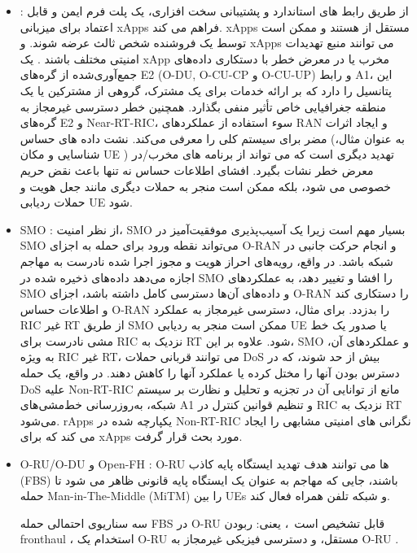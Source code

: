 \begin{itemize}
	\item {} :
	از طریق رابط های استاندارد و پشتیبانی سخت افزاری،  یک پلت فرم ایمن و قابل اعتماد برای میزبانی xApps فراهم می کند. xApps مستقل از  هستند و ممکن است توسط یک فروشنده شخص ثالث عرضه شوند.  و xApps می توانند منبع تهدیدات امنیتی مختلف باشند \cite{ORANSec}.
	یک xApp مخرب یا در معرض خطر با دستکاری داده‌های جمع‌آوری‌شده از گره‌های E2 (O-DU, O-CU-CP و O-CU-UP) و رابط A1، این پتانسیل را دارد که بر ارائه خدمات برای یک مشترک، گروهی از مشترکین یا یک منطقه جغرافیایی خاص تأثیر منفی بگذارد.
	همچنین خطر دسترسی غیرمجاز به گره‌های E2 و Near-RT-RIC، سوء استفاده از عملکردهای RAN و ایجاد اثرات مضر برای سیستم کلی را معرفی می‌کند.
	نشت داده های حساس
	 (به عنوان مثال، شناسایی و مکان 
	 UE
	 ) 
	تهدید دیگری است که می تواند از برنامه های مخرب/در معرض خطر نشات بگیرد.
	افشای اطلاعات حساس نه تنها باعث نقض حریم خصوصی می شود، بلکه ممکن است منجر به حملات دیگری مانند جعل هویت و حملات ردیابی UE شود.
	
\item SMO :
از نظر امنیت، SMO بسیار مهم است زیرا یک آسیب‌پذیری موفقیت‌آمیز در SMO می‌تواند نقطه ورود برای حمله به اجزای O-RAN و انجام حرکت جانبی در شبکه باشد.
در واقع، رویه‌های احراز هویت و مجوز اجرا شده نادرست به مهاجم اجازه می‌دهد داده‌های ذخیره شده در SMO را افشا و تغییر دهد، به عملکردهای SMO و داده‌های آن‌ها دسترسی کامل داشته باشد، اجزای O-RAN را دستکاری کند و اطلاعات حساس O-RAN را بدزدد.
برای مثال، دسترسی غیرمجاز به عملکرد RIC غیر RT از طریق SMO ممکن است منجر به ردیابی UE یا صدور یک خط مشی نادرست برای RIC نزدیک به RT شود.
علاوه بر این، SMO و عملکردهای آن، به ویژه RIC غیر RT، می توانند قربانی حملات DoS بیش از حد شوند، که در دسترس بودن آنها را مختل کرده یا عملکرد آنها را کاهش دهند.
در واقع، یک حمله DoS علیه Non-RT-RIC مانع از توانایی آن در تجزیه و تحلیل و نظارت بر سیستم شبکه، به‌روزرسانی خط‌مشی‌های A1 و تنظیم قوانین کنترل در RIC نزدیک به RT~\cite{ORANSec} می‌شود.
rApps یکپارچه شده در Non-RT-RIC نگرانی های امنیتی مشابهی را ایجاد می کند که برای xApps مورد بحث قرار گرفت.
\item 
O-RU/O-DU و Open-FH :
O-RU ها می توانند هدف تهدید ایستگاه پایه کاذب (FBS) باشند، جایی که مهاجم به عنوان یک ایستگاه پایه قانونی ظاهر می شود تا حمله Man-in-The-Middle (MiTM) را بین UEs و شبکه تلفن همراه فعال کند.

سه سناریوی احتمالی حمله FBS در O-RU قابل تشخیص است~\cite{ORANSec}، یعنی: ربودن fronthaul ، استخدام یک O-RU مستقل، و دسترسی فیزیکی غیرمجاز به O-RU
.


\end{itemize}

